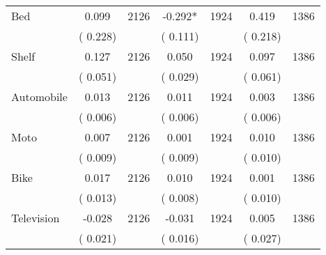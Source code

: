\begin{tabular}{l*{6}{c}}
Bed        &              0.099      &       2126       &             -0.292*      &       1924       &              0.419      &       1386       \\
                       &       (       0.228)            &                               &       (       0.111)            &                               &       (       0.218)            &                               \\
Shelf        &              0.127      &       2126       &              0.050      &       1924       &              0.097      &       1386       \\
                       &       (       0.051)            &                               &       (       0.029)            &                               &       (       0.061)            &                               \\
Automobile        &              0.013      &       2126       &              0.011      &       1924       &              0.003      &       1386       \\
                       &       (       0.006)            &                               &       (       0.006)            &                               &       (       0.006)            &                               \\
Moto        &              0.007      &       2126       &              0.001      &       1924       &              0.010      &       1386       \\
                       &       (       0.009)            &                               &       (       0.009)            &                               &       (       0.010)            &                               \\
Bike        &              0.017      &       2126       &              0.010      &       1924       &              0.001      &       1386       \\
                       &       (       0.013)            &                               &       (       0.008)            &                               &       (       0.010)            &                               \\
Television        &             -0.028      &       2126       &             -0.031      &       1924       &              0.005      &       1386       \\
                       &       (       0.021)            &                               &       (       0.016)            &                               &       (       0.027)            &                               \\

\end{tabular}
